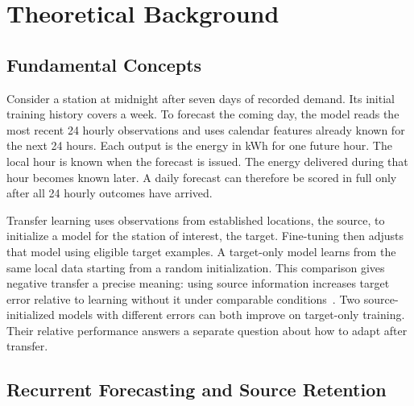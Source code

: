 \chapter{Theoretical Background}\label{chap:theoretical_background}

\section{Fundamental Concepts}

Consider a station at midnight after seven days of recorded demand. Its initial training history covers a week. To forecast the coming day, the model reads the most recent 24 hourly observations and uses calendar features already known for the next 24 hours. Each output is the energy in kWh for one future hour. The local hour is known when the forecast is issued. The energy delivered during that hour becomes known later. A daily forecast can therefore be scored in full only after all 24 hourly outcomes have arrived.

Transfer learning uses observations from established locations, the source, to initialize a model for the station of interest, the target. Fine-tuning then adjusts that model using eligible target examples. A target-only model learns from the same local data starting from a random initialization. This comparison gives negative transfer a precise meaning: using source information increases target error relative to learning without it under comparable conditions~\cite{wang2019negative}. Two source-initialized models with different errors can both improve on target-only training. Their relative performance answers a separate question about how to adapt after transfer.

\section{Recurrent Forecasting and Source Retention}

